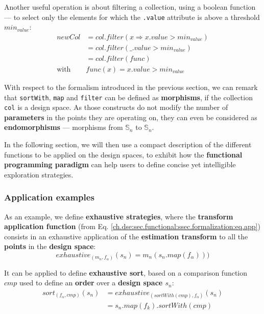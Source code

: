             Another useful operation is about filtering a collection, using a boolean function --- \eg to select only the elements for which the {\tt .value} attribute is above a threshold $min_{value}$:
            \begin{equation}
                \label{ch.dse:sec.functional:ssec.formalization:eq.filter}
                \begin{split}
                    newCol &= col.filter(x \Rightarrow x.value > min_{value})\\
                           &= col.filter(\_.value > min_{value})\\
                           &= col.filter(func)\\
                       \text{with}\: &func(x) = x.value > min_{value}
                \end{split}
            \end{equation}

            With respect to the formalism introduced in the previous section, we can remark that {\tt sortWith}, {\tt map} and {\tt filter} can be defined as {\bf morphisms}, if the collection {\tt col} is a design space.
            As those constructs do not modify the number of {\bf parameters} in the points they are operating on, they can even be considered as {\bf endomorphisms} --- \ie morphisms from $\mathbb{S}_n$ to $\mathbb{S}_n$.

            In the following section, we will then use a compact description of the different functions to be applied on the design spaces, to exhibit how the {\bf functional programming paradigm} can help users to define concise yet intelligible exploration strategies.

\clearpage
        \subsubsection{Application examples}
            As an example, we define {\bf exhaustive strategies}, where the {\bf transform application function} (from Eq. \ref{ch.dse:sec.functional:ssec.formalization:eq.app}) consists in an exhaustive application of the {\bf estimation transform} to all the {\bf points} in the {\bf design space}:
            \begin{equation}
                exhaustive_{(m_n, f_\alpha)}(s_n) = m_n(s_n.map(f_\alpha)))
            \end{equation}

            It can be applied to define {\bf exhaustive sort}, based on a comparison function $cmp$ used to define an {\bf order} over a {\bf design space $s_n$}:
            \begin{equation}
                \label{ch.dse:sec.functional:ssec.formalization:sssec.application:eq.sort}
                \begin{split}
                    sort_{(f_\alpha, cmp)}(s_n) &= exhaustive_{(sortWith(cmp), f_\alpha)}(s_n)\\
                                              &= s_n.map(f_k).sortWith(cmp)
                \end{split}
            \end{equation}
            
